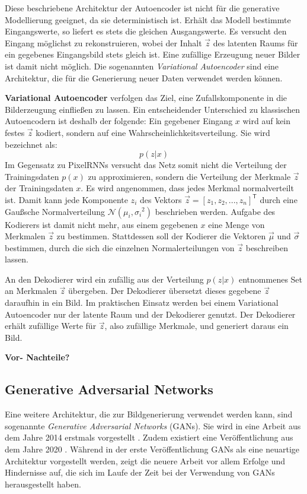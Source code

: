 Diese beschriebene Architektur der Autoencoder ist nicht für die generative Modellierung geeignet, da sie deterministisch ist. Erhält das Modell bestimmte Eingangswerte, so liefert es stets die gleichen Ausgangswerte. Es versucht den Eingang möglichst zu rekonstruieren, wobei der Inhalt $\vec{z}$ des latenten Raums für ein gegebenes Eingangsbild stets gleich ist. Eine zufällige Erzeugung neuer Bilder ist damit nicht möglich. Die sogenannten \emph{Variational Autoencoder} sind eine Architektur, die für die Generierung neuer Daten verwendet werden können. \cite{visualApproach} \cite{generativeModelsSurvey}

\textbf{Variational Autoencoder} verfolgen das Ziel, eine Zufallskomponente in die Bilderzeugung einfließen zu lassen. Ein entscheidender Unterschied zu klassischen Autoencodern ist deshalb der folgende: Ein gegebener Eingang $x$ wird auf kein festes $\vec{z}$ kodiert, sondern auf eine Wahrscheinlichkeitsverteilung. Sie wird bezeichnet als: \cite{autoencoders}
\begin{equation}
   p(z|x)
\end{equation}
Im Gegensatz zu \acp{PixelRNN} versucht das Netz somit nicht die Verteilung der Trainingsdaten $p(x)$ zu approximieren, sondern die Verteilung der Merkmale $\vec{z}$ der Trainingsdaten $x$.
Es wird angenommen, dass jedes Merkmal normalverteilt ist. Damit kann jede Komponente $z_{i}$ des Vektors $\vec{z} = [z_{1}, z_{2}, ..., z_{n}]^\mathsf{T}$ durch eine Gaußsche Normalverteilung $\mathcal{N}(\mu_{i}, {\sigma_{i}}^{2})$ beschrieben werden. Aufgabe des Kodierers ist damit nicht mehr, aus einem gegebenen $x$ eine Menge von Merkmalen $\vec{z}$ zu bestimmen. Stattdessen soll der Kodierer die Vektoren $\vec{\mu}$ und $\vec{\sigma}$ bestimmen, durch die sich die einzelnen Normalerteilungen von $\vec{z}$ beschreiben lassen. \cite{generativeModelsSurvey} \cite{autoencoders}

An den Dekodierer wird ein zufällig aus der Verteilung $p(z|x)$ entnommenes Set an Merkmalen $\vec{z}$ übergeben.
Der Dekodierer übersetzt dieses gegebene $\vec{z}$ daraufhin in ein Bild. Im praktischen Einsatz werden bei einem Variational Autoencoder nur der latente Raum und der Dekodierer genutzt. Der Dekodierer erhält zufällige Werte für $\vec{z}$, also zufällige Merkmale, und generiert daraus ein Bild. \cite{autoencoders} \cite{visualApproach}

\textbf{Vor- Nachteile?}

\cite{autoencoders}

\label{chap:GANs}
\subsection{Generative Adversarial Networks}
Eine weitere Architektur, die zur Bildgenerierung verwendet werden kann, sind sogenannte \emph{Generative Adversarial Networks} (\acsp{GAN}). Sie wird in eine Arbeit aus dem Jahre 2014 erstmals vorgestellt \cite{Goodfellow-GANs}. Zudem existiert eine Veröffentlichung aus dem Jahre 2020 \cite{GANs}. Während in der erste Veröffentlichung \acp{GAN} als eine neuartige Architektur vorgestellt werden, zeigt die neuere Arbeit vor allem Erfolge und Hindernisse auf, die sich im Laufe der Zeit bei der Verwendung von \acp{GAN} herausgestellt haben.

